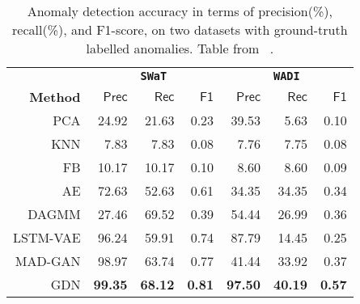 \documentclass[../description.tex]{subfiles}
\begin{document}
    \begin{table}
        \centering\fontsize{9}{11}\selectfont
        \begin{tabular}{rrrrrrr}
            \toprule
              & \multicolumn{3}{c}{\textbf{\texttt{SWaT}}} & \multicolumn{3}{c}{\textbf{\texttt{WADI}}} \\
             \cmidrule(r){2-4} \cmidrule(r){5-7}
             \textbf{Method} & $\mathbf{\mathsf{Prec}}$ & $\mathbf{\mathsf{Rec}}$ & $\mathbf{\mathsf{F1}}$ & $\mathbf{\mathsf{Prec}}$ & $\mathbf{\mathsf{Rec}}$ & $\mathbf{\mathsf{F1}}$ \\
             \midrule
             \textsc{\ac{PCA}}                & 24.92 & 21.63 & 0.23 & 39.53 & 5.63  & 0.10 \\
             \textsc{\ac{KNN}}                & 7.83  & 7.83  & 0.08 & 7.76  & 7.75  & 0.08 \\
             \textsc{FB}                      & 10.17 & 10.17 & 0.10 & 8.60  & 8.60  & 0.09 \\
             \textsc{\ac{AE}}                 & 72.63 & 52.63 & 0.61 & 34.35 & 34.35 & 0.34 \\
             \textsc{\footnotesize{DAGMM}}    & 27.46 & 69.52 & 0.39 & 54.44 & 26.99 & 0.36 \\
             \textsc{\footnotesize{LSTM-VAE}} & 96.24 & 59.91 & 0.74 & 87.79 & 14.45 & 0.25 \\
             \textsc{\footnotesize{MAD-GAN}}  & 98.97 & 63.74 & 0.77 & 41.44 & 33.92 & 0.37 \\
             \midrule
             \textsc{\ac{GDN}} & \textbf{99.35} & \textbf{68.12} & \textbf{0.81} &\textbf{97.50} & \textbf{40.19} & \textbf{0.57} \\
             \bottomrule
        \end{tabular}%
        \caption{Anomaly detection accuracy in terms of precision(\%), recall(\%), and F1-score, on two datasets with ground-truth labelled anomalies. Table from ~\cite{Deng.2021}.}
        \label{tab:performance}
    \end{table}
    
\end{document}
